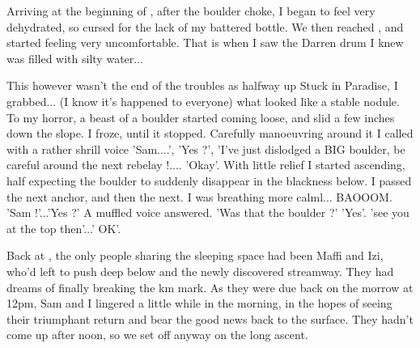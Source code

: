 Arriving at the beginning of , after the boulder choke, I began to feel very dehydrated, so cursed for the lack of my battered bottle. We then reached , and started feeling very uncomfortable. That is when I saw the Darren drum I knew was filled with silty water...

This however wasn't the end of the troubles as halfway up Stuck in Paradise, I grabbed... (I know it's happened to everyone) what looked like a stable nodule. To my horror, a beast of a boulder started coming loose, and slid a few inches down the slope. I froze, until it stopped. Carefully manoeuvring around it I called with a rather shrill voice 'Sam....', 'Yes ?', 'I've just dislodged a BIG boulder, be careful around the next rebelay !.... 'Okay'. With little relief I started ascending, half expecting the boulder to suddenly disappear in the blackness below. I passed the next anchor, and then the next. I was breathing more calml... BAOOOM.
'Sam !'...'Yes ?' A muffled voice answered. 'Was that the boulder ?' 'Yes'. 'see you at the top then'...' OK'.

Back at , the only people sharing the sleeping space had been Maffi and Izi, who'd left to push deep below  and the newly discovered  streamway. They had dreams of finally breaking the km mark. As they were due back on the morrow at 12pm, Sam and I lingered a little while in the morning, in the hopes of seeing their triumphant return and bear the good news back to the surface. They hadn't come up after noon, so we set off anyway on the long ascent. 

\begin{figure}[b!]
\end{figure}

